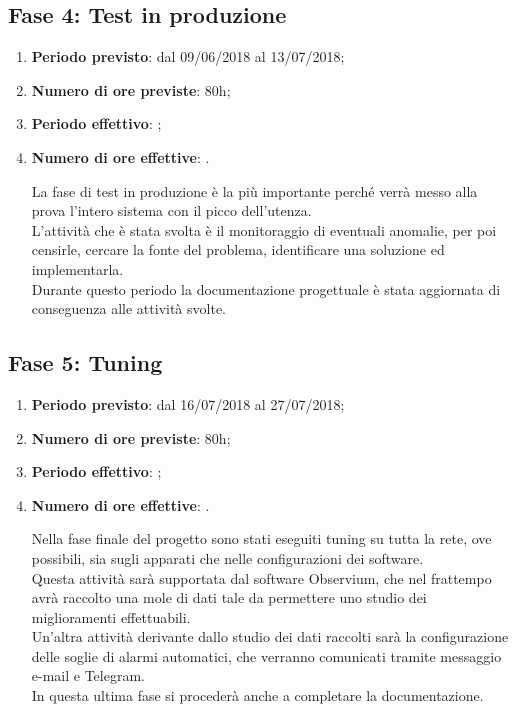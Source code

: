 \documentclass[Tesi.tex]{subfiles}
\begin{document}
\subsection{Fase 4: Test in produzione}
\begin{enumerate}
	\item \textbf{Periodo previsto}: dal 09/06/2018 al 13/07/2018;
	\item \textbf{Numero di ore previste}: 80h;
	\item \textbf{Periodo effettivo}: ;
	\item \textbf{Numero di ore effettive}: .
	
La fase di test in produzione è la più importante perché verrà messo alla prova l'intero sistema con il picco dell'utenza. \\
L'attività che è stata svolta è il monitoraggio di eventuali anomalie, per poi censirle, cercare la fonte del problema, identificare una soluzione ed implementarla. \\
Durante questo periodo la documentazione progettuale è stata aggiornata di conseguenza alle attività svolte.\\

	
\end{enumerate}

\subsection{Fase 5: Tuning}
\begin{enumerate}
	\item \textbf{Periodo previsto}: dal 16/07/2018 al 27/07/2018;
	\item \textbf{Numero di ore previste}: 80h;
	\item \textbf{Periodo effettivo}: ;
	\item \textbf{Numero di ore effettive}: .
	
Nella fase finale del progetto sono stati eseguiti tuning su tutta la rete, ove possibili, sia sugli apparati che nelle configurazioni dei software. \\
Questa attività sarà supportata dal software Observium, che nel frattempo avrà raccolto una mole di dati tale da permettere uno studio dei miglioramenti effettuabili.\\
Un'altra attività derivante dallo studio dei dati raccolti sarà la configurazione delle soglie di alarmi automatici, che verranno comunicati tramite messaggio e-mail e Telegram. \\
In questa ultima fase si procederà anche a completare la documentazione. \\
	
\end{enumerate}
\end{document}
